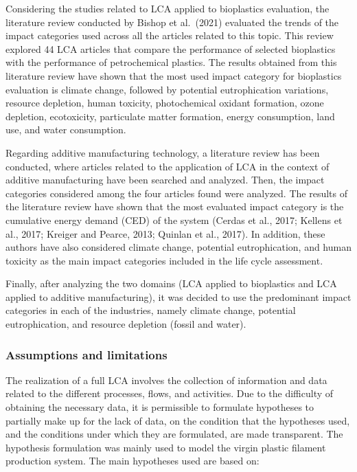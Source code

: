 \documentclass[]{elsarticle} %
\begin{document}
Considering the studies related to LCA applied to bioplastics evaluation, the literature review conducted by Bishop et al.~(2021) evaluated the trends of the impact categories used across all the articles related to this topic. This review explored 44 LCA articles that compare the performance of selected bioplastics with the performance of petrochemical plastics. The results obtained from this literature review have shown that the most used impact category for bioplastics evaluation is climate change, followed by potential eutrophication variations, resource depletion, human toxicity, photochemical oxidant formation, ozone depletion, ecotoxicity, particulate matter formation, energy consumption, land use, and water consumption.

Regarding additive manufacturing technology, a literature review has been conducted, where articles related to the application of LCA in the context of additive manufacturing have been searched and analyzed. Then, the impact categories considered among the four articles found were analyzed. The results of the literature review have shown that the most evaluated impact category is the cumulative energy demand (CED) of the system (Cerdas et al., 2017; Kellens et al., 2017; Kreiger and Pearce, 2013; Quinlan et al., 2017). In addition, these authors have also considered climate change, potential eutrophication, and human toxicity as the main impact categories included in the life cycle assessment.

Finally, after analyzing the two domains (LCA applied to bioplastics and LCA applied to additive manufacturing), it was decided to use the predominant impact categories in each of the industries, namely climate change, potential eutrophication, and resource depletion (fossil and water).

\hypertarget{assumptions-and-limitations}{%
\subsubsection{Assumptions and limitations}\label{assumptions-and-limitations}}

The realization of a full LCA involves the collection of information and data related to the different processes, flows, and activities. Due to the difficulty of obtaining the necessary data, it is permissible to formulate hypotheses to partially make up for the lack of data, on the condition that the hypotheses used, and the conditions under which they are formulated, are made transparent.
The hypothesis formulation was mainly used to model the virgin plastic filament production system. The main hypotheses used are based on:
\end{document}

